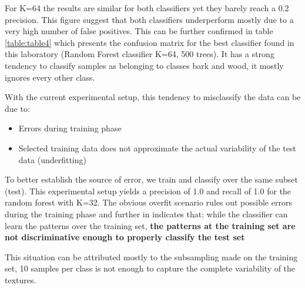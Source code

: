 \documentclass[10pt,twocolumn,letterpaper]{article}
\begin{document}
For K=64 the results are similar for both classifiers yet they barely reach a 0.2 precision. This figure suggest that both classifiers underperform mostly due to a very high number of false positives. This can be further confirmed in table \ref{table:table4} which presents the confusion matrix for the best classifier found in this laboratory (Random Forest classifier K=64, 500 trees). It has a strong tendency to classify samples as belonging to classes bark and wood, it mostly ignores every other class.

With the current experimental setup, this tendency to misclassify the data can be due to:

\begin{itemize}
	\item Errors during training phase
	\item Selected training data does not approximate the actual variability of the test data (underfitting)
\end{itemize}

To better establish the source of error, we train and classify over the same subset (test). This experimental setup yields a precision of 1.0 and recall of 1.0 for the random forest with K=32. The obvious overfit scenario rules out possible errors during the training phase and further in indicates that: while the classifier can learn the patterns over the training set, \textbf{the patterns at the training set are not discriminative enough to properly classify the test set}

This situation can be attributed mostly to the subsampling made on the training set, 10 samples per class is not enough to capture the complete variability of the textures.
\end{document}
